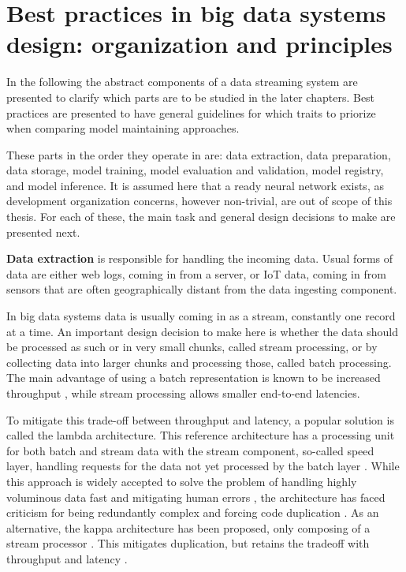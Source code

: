 \section{Best practices in big data systems design: organization and principles}

In the following the abstract components of a data streaming system are presented to clarify which parts are to be studied in the later chapters. Best practices are presented to have general guidelines for which traits to priorize when comparing model maintaining approaches.

These parts in the order they operate in are: data extraction, data preparation, data storage, model training, model evaluation and validation, model registry, and model inference. It is assumed here that a ready neural network exists, as development organization concerns, however non-trivial, are out of scope of this thesis. For each of these, the main task and general design decisions to make are presented next.

\textbf{Data extraction} is responsible for handling the incoming data. Usual forms of data are either web logs, coming in from a server, or IoT data, coming in from sensors that are often geographically distant from the data ingesting component.

In big data systems data is usually coming in as a stream, constantly one record at a time. An important design decision to make here is whether the data should be processed as such or in very small chunks, called stream processing, or by collecting data into  larger chunks and processing those, called batch processing. The main advantage of using a batch representation is known to be increased throughput%
, while stream processing allows smaller end-to-end latencies. %

To mitigate this trade-off between throughput and latency, a popular solution is called the lambda architecture. This reference architecture has a processing unit for both batch and stream data with the stream component, so-called speed layer, handling requests for the data not yet processed by the batch layer \cite{beatingcap}. While this approach is widely accepted to solve the problem of handling highly voluminous data fast and mitigating human errors \cite{lambdakappa}, the architecture has faced criticism for being redundantly complex and forcing code duplication \cite{questioninglambda} \cite{uber} \cite{facebook}. As an alternative, the kappa architecture has been proposed, only composing of a stream processor \cite{questioninglambda}. This mitigates duplication, but retains the tradeoff with throughput and latency \cite{lambdakappa}.


